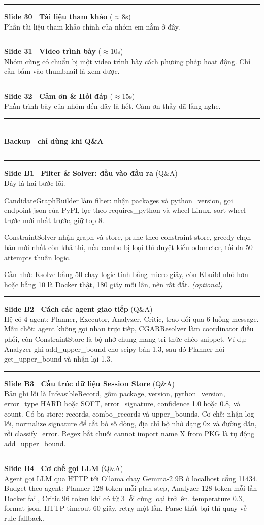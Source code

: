 \documentclass[11pt]{article}
\newcommand{\stagenote}[1]{{\small\itshape\color{gray}#1}}
\newcommand{\parthead}[2]{%
  \vspace{1.4em}\par
  {\noindent\color{navydeep}\rule{\linewidth}{1.4pt}}\\[0.35em]
  {\bfseries\Large\color{navydeep}#1}\hfill{\normalsize\color{accent}\bfseries #2}\\[-0.35em]
  {\noindent\color{navydeep}\rule{\linewidth}{1.4pt}}
  \par\vspace{0.6em}%
}
\newcommand{\slidehead}[3]{%
  \vspace{1.05em}\par\noindent
  {\color{accent}\rule[-0.18em]{3pt}{1.05em}}\hspace{0.5em}%
  {\bfseries\large\color{navydeep}Slide #1 \textperiodcentered\ #2}%
  \hfill{\small\color{gray}(#3)}\\[0.25em]%
}
\begin{document}
\slidehead{30}{Tài liệu tham khảo}{$\approx$8s}
Phần tài liệu tham khảo chính của nhóm em nằm ở đây.

\slidehead{31}{Video trình bày}{$\approx$10s}
Nhóm cũng có chuẩn bị một video trình bày cách phương pháp hoạt động. Chỉ cần bấm vào thumbnail là xem được.

\slidehead{32}{Cảm ơn \& Hỏi đáp}{$\approx$15s}
Phần trình bày của nhóm đến đây là hết. Cảm ơn thầy đã lắng nghe.

\parthead{Backup \textperiodcentered\ chỉ dùng khi Q\&A}{}

\slidehead{B1}{Filter \& Solver: đầu vào đầu ra}{Q\&A}
Đây là hai bước lõi.

CandidateGraphBuilder làm filter: nhận packages và python\_version, gọi endpoint json của PyPI, lọc theo requires\_python và wheel Linux, sort wheel trước mới nhất trước, giữ top 8.

ConstraintSolver nhận graph và store, prune theo constraint store, greedy chọn bản mới nhất còn khả thi, nếu combo bị loại thì duyệt kiểu odometer, tối đa 50 attempts thuần logic.

Cần nhớ: Ksolve bằng 50 chạy logic tính bằng micro giây, còn Kbuild nhỏ hơn hoặc bằng 10 là Docker thật, 180 giây mỗi lần, nên rất đắt. \stagenote{(optional)}

\slidehead{B2}{Cách các agent giao tiếp}{Q\&A}
Hệ có 4 agent: Planner, Executor, Analyzer, Critic, trao đổi qua 6 luồng message. Mấu chốt: agent không gọi nhau trực tiếp, CGARResolver làm coordinator điều phối, còn ConstraintStore là bộ nhớ chung mang tri thức chéo snippet. Ví dụ: Analyzer ghi add\_upper\_bound cho scipy bản 1.3, sau đó Planner hỏi get\_upper\_bound và nhận lại 1.3.

\slidehead{B3}{Cấu trúc dữ liệu Session Store}{Q\&A}
Bản ghi lỗi là InfeasibleRecord, gồm package, version, python\_version, error\_type HARD hoặc SOFT, error\_signature, confidence 1.0 hoặc 0.8, và count. Có ba store: records, combo\_records và upper\_bounds. Cơ chế: nhận log lỗi, normalize signature để cắt bỏ số dòng, địa chỉ bộ nhớ dạng 0x và đường dẫn, rồi classify\_error. Regex bắt chuỗi cannot import name X from PKG là tự động add\_upper\_bound.

\slidehead{B4}{Cơ chế gọi LLM}{Q\&A}
Agent gọi LLM qua HTTP tới Ollama chạy Gemma-2 9B ở localhost cổng 11434. Budget theo agent: Planner 128 token mỗi plan step, Analyzer 128 token mỗi lần Docker fail, Critic 96 token khi có từ 3 lỗi cùng loại trở lên. temperature 0.3, format json, HTTP timeout 60 giây, retry một lần. Parse thất bại thì quay về rule fallback.
\end{document}
